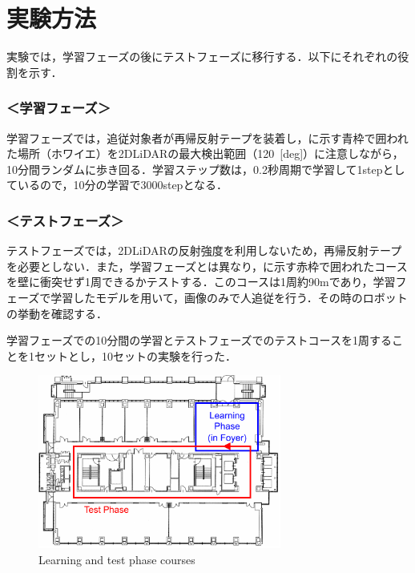 \section{実験方法}

  実験では，学習フェーズの後にテストフェーズに移行する．以下にそれぞれの役割を示す．

  \subsubsection*{＜学習フェーズ＞}
  学習フェーズでは，追従対象者が再帰反射テープを装着し，に示す青枠で囲われた場所（ホワイエ）を2DLiDARの最大検出範囲（120\, [deg]）に注意しながら，10分間ランダムに歩き回る．学習ステップ数は，0.2秒周期で学習して1stepとしているので，10分の学習で3000stepとなる．

  \subsubsection*{＜テストフェーズ＞}
  テストフェーズでは，2DLiDARの反射強度を利用しないため，再帰反射テープを必要としない．また，学習フェーズとは異なり，に示す赤枠で囲われたコースを壁に衝突せず1周できるかテストする．このコースは1周約90mであり，学習フェーズで学習したモデルを用いて，画像のみで人追従を行う．その時のロボットの挙動を確認する．

  \vspace{0.5cm}

  学習フェーズでの10分間の学習とテストフェーズでのテストコースを1周することを1セットとし，10セットの実験を行った．

  \begin{figure}[h]
    \centering
    \includegraphics[width=8cm] {images/pdf/RobotGuidance_course}
    \captionsetup{justification=raggedright} %
    \caption{Learning and test phase courses}
    \label{Fig:RobotGuidance_course}
  \end{figure}

